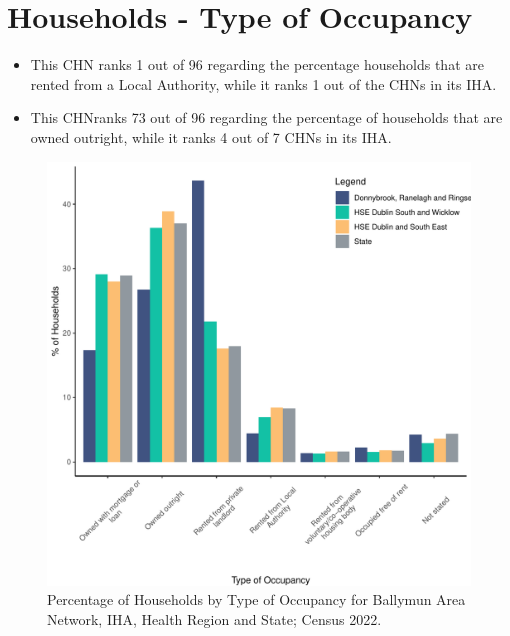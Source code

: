 \documentclass{article}
\begin{document}
\section{Households - Type of Occupancy}\label{sect:Households}
\begin{itemize}
\item This CHN ranks  1 out of 96 regarding the percentage households that are rented from a Local Authority, while it ranks  1 out of the CHNs in its IHA. 
\item This CHNranks  73 out of 96 regarding the percentage of households that are owned outright, while it ranks   4 out of 7 CHNs in its IHA.
\end{itemize}
\begin{figure}[H]
	\centering
	\includegraphics[width = 140mm]{../figures/HouseholdsED.pdf}
	\caption{Percentage of Households by Type of Occupancy for Ballymun Area Network, IHA, Health Region and State; Census 2022.}
	\label{fig:vbnv}
	\end{figure}
\end{document}
